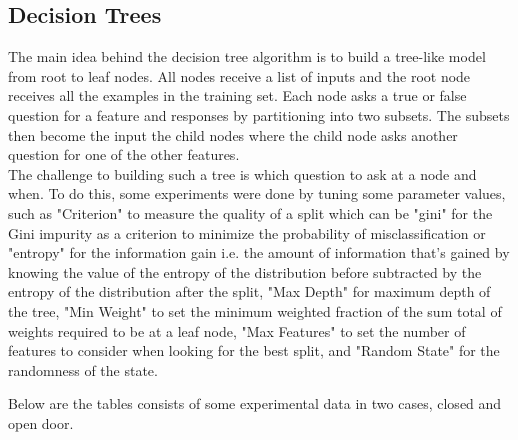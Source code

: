 \documentclass[conference]{IEEEtran}
\begin{document}
\subsection{Decision Trees}

The main idea behind the decision tree algorithm is to build a tree-like model from root to leaf nodes. All nodes receive a list of inputs and the root node receives all the examples in the training set. Each node asks a true or false question for a feature and responses by partitioning into two subsets. The subsets then become the input the child nodes where the child node asks another question for one of the other features.\\

The challenge to building such a tree is which question to ask at a node and when. To do this, some experiments were done by tuning some parameter values, such as "Criterion" to measure the quality of a split which can be "gini" for the Gini impurity as a criterion to minimize the probability of misclassification or "entropy" for the information gain i.e. the amount of information that's gained by knowing the value of the entropy of the distribution before subtracted by the entropy of the distribution after the split, "Max Depth" for maximum depth of the tree, "Min Weight" to set the minimum weighted fraction of the sum total of weights required to be at a leaf node, "Max Features" to set the number of features to consider when looking for the best split, and "Random State" for the randomness of the state.   

Below are the tables consists of some experimental data in two cases, closed and open door.
\end{document}
